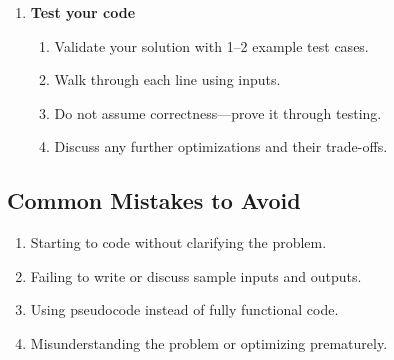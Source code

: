 \begin{summary}
\begin{enumerate}
        \item \textbf{Test your code}
        \begin{enumerate}
            \item Validate your solution with 1–2 example test cases.
            \item Walk through each line using inputs.
            \item Do not assume correctness—prove it through testing.
            \item Discuss any further optimizations and their trade-offs.
        \end{enumerate}
    \end{enumerate}
\end{summary}

\subsection{Common Mistakes to Avoid}
\begin{warning}
    \begin{enumerate}
        \item Starting to code without clarifying the problem.
        \item Failing to write or discuss sample inputs and outputs.
        \item Using pseudocode instead of fully functional code.
        \item Misunderstanding the problem or optimizing prematurely.
    \end{enumerate}
\end{warning}